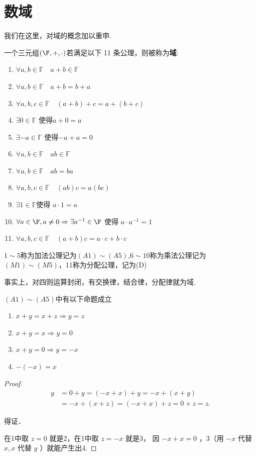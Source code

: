 \section{数域}
我们在这里，对域的概念加以重申.
\begin{definition}\label{1.6.1}
	一个三元组$(\F,+,\cdot)$若满足以下 11 条公理，则被称为\textbf{域}:
	\begin{enumerate}
		\item $\forall a, b \in \mathbb{F} \quad a+b \in \mathbb{F}$
		\item $\forall a, b \in \mathbb{F} \quad a+b=b+a$
		\item $\forall a, b, c \in \mathbb{F} \quad(a+b)+c=a+(b+c)$
		\item $\exists 0 \in \mathbb{F}$ 使得$a+0=a$
		\item $\exists-a \in \mathbb{F}$ 使得$-a+a=0$
		\item $\forall a, b \in \mathbb{F} \quad a b \in \mathbb{F}$
		\item $\forall a, b \in \mathbb{F} \quad a b=b a$
		\item $\forall a, b, c \in \mathbb{F} \quad(a b) c=a(b c)$
		\item $\exists 1 \in \mathbb{F}$使得 $a \cdot 1=a$
		\item $\forall a \in \F, a \neq 0 \Rightarrow \exists a^{-1} \in \F$ 使得 $a \cdot a^{-1}=1$
		\item $\forall a, b, c \in \mathbb{F} \quad(a+b) c=a \cdot c+b \cdot c$
	\end{enumerate}
	$1\sim5$称为加法公理记为$(A1)\sim(A5)$,$6\sim10$称为乘法公理记为$(M1)\sim(M5)$，11称为分配公理，记为(D)
\end{definition}
事实上，对四则运算封闭，有交换律，结合律，分配律就为域.
\begin{proposition}\label{1.6.2}
	$(A1)\sim(A5)$中有以下命题成立
	\begin{enumerate}
		\item $x+y=x+z \Rightarrow y=z$
		\item $x+y=x \Rightarrow y=0$
		\item$x+y=0 \Rightarrow y=-x$
		
		\item $-(-x)=x$
	\end{enumerate}
\end{proposition}
\begin{proof}
	$$
	\begin{aligned}
		y & =0+y=(-x+x)+y=-x+(x+y) \\
		& =-x+(x+z)=(-x+x)+z=0+z=z .
	\end{aligned}
	$$
	
	
	得证．
	
	在1中取 $z=0$ 就是2，在1中取 $z=-x$ 就是3，
	因 $-x+x=0$ ，3（用 $-x$ 代替 $x, x$ 代替 $y$ ）就能产生出4.
\end{proof}
